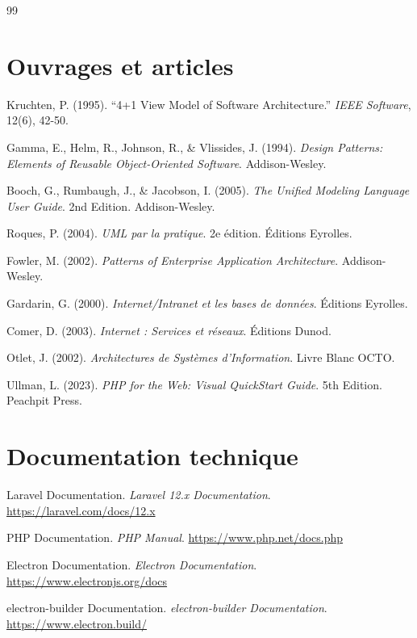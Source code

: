 \documentclass[12pt,a4paper,twoside]{report}
\begin{document}
\begin{thebibliography}{99}

\section*{Ouvrages et articles}

Kruchten, P. (1995). ``4+1 View Model of Software Architecture.'' \textit{IEEE Software}, 12(6), 42-50.

Gamma, E., Helm, R., Johnson, R., \& Vlissides, J. (1994). \textit{Design Patterns: Elements of Reusable Object-Oriented Software}. Addison-Wesley.

Booch, G., Rumbaugh, J., \& Jacobson, I. (2005). \textit{The Unified Modeling Language User Guide}. 2nd Edition. Addison-Wesley.

Roques, P. (2004). \textit{UML par la pratique}. 2e édition. Éditions Eyrolles.

Fowler, M. (2002). \textit{Patterns of Enterprise Application Architecture}. Addison-Wesley.

Gardarin, G. (2000). \textit{Internet/Intranet et les bases de données}. Éditions Eyrolles.

Comer, D. (2003). \textit{Internet : Services et réseaux}. Éditions Dunod.

Otlet, J. (2002). \textit{Architectures de Systèmes d'Information}. Livre Blanc OCTO.

Ullman, L. (2023). \textit{PHP for the Web: Visual QuickStart Guide}. 5th Edition. Peachpit Press.

\section*{Documentation technique}

Laravel Documentation. \textit{Laravel 12.x Documentation}. \url{https://laravel.com/docs/12.x}

PHP Documentation. \textit{PHP Manual}. \url{https://www.php.net/docs.php}

Electron Documentation. \textit{Electron Documentation}. \url{https://www.electronjs.org/docs}

electron-builder Documentation. \textit{electron-builder Documentation}. \url{https://www.electron.build/}


\end{thebibliography}
\end{document}
